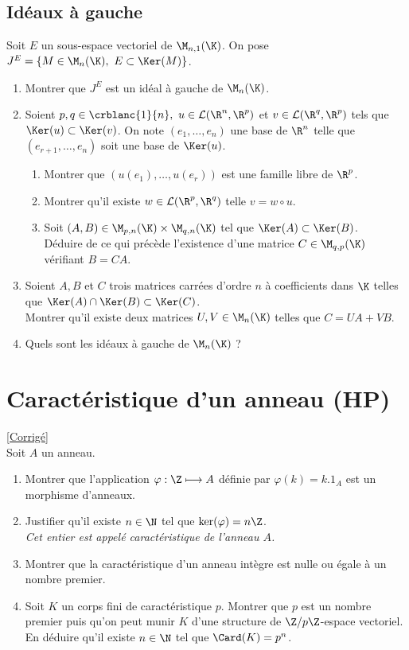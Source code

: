 \documentclass[8pt]{book}
\begin{document}
	\subsection{Idéaux à gauche }
	Soit $E$ un sous-espace vectoriel de $\M_{n,1}(\K)$. On pose $J^E=\{M\in \M_n(\K),\ E\subset \Ker(M)\}$.
	\begin{enumerate}
		\item Montrer que $J^E$ est un idéal à gauche de $\M_n(\K)$.
		\item Soient $p,q\in \crblanc{1}{n},\ u\in \mathcal L(\R^n,\R^p)$ et $v\in \mathcal L(\R^q,\R^p)$ tels que $\Ker(u)\subset \Ker(v)$. On note $(e_1,\dots,e_n)$ une base de $\R^n$ telle que $(e_{r+1},\dots,e_n)$ soit une base de $\Ker(u)$.
		\begin{enumerate}[label=\alph*.]
			\item Montrer que $(u(e_1),\dots,u(e_r))$ est une famille libre de $\R^p$.
			\item Montrer qu'il existe $w\in \mathcal L(\R^p,\R^q)$ telle $v=w\circ u$.
			\item Soit $(A,B)\in \M_{p,n}(\K)\times \M_{q,n}(\K)$ tel que $\Ker(A)\subset \Ker(B)$.\\
			Déduire de ce qui précède l'existence d'une matrice $C\in \M_{q,p}(\K)$ vérifiant $B=CA$.
		\end{enumerate}
		\item Soient $A,B$ et $C$ trois matrices carrées d'ordre $n$ à coefficients dans $\K$ telles que $\Ker(A)\cap\Ker(B)\subset \Ker(C)$.\\
		Montrer qu'il existe deux matrices $U,V\in \M_n(\K)$ telles que $C=UA+VB$.
		\item Quels sont les idéaux à gauche de $\M_n(\K)$ ?
	\end{enumerate}
	
	\section{Caractéristique d'un anneau  (HP)}
	\label{Caractéristique d'un anneau}
	\textcolor{blue}{\hyperref[Caractéristique d'un anneau corrigé]{[Corrigé]}}\\
	Soit $A$ un anneau.
	\begin{enumerate}[leftmargin=*]
		\item Montrer que l'application $\varphi :\Z \longmapsto A$ définie par $\varphi(k)=k.1_A$ est un morphisme d'anneaux.
		\item Justifier qu'il existe $n\in \N$ tel que $\ker(\varphi)=n\Z$.\\
		\textit{Cet entier est appelé caractéristique de l'anneau $A$.}
		\item Montrer que la caractéristique d'un anneau intègre est nulle ou égale à un nombre premier.
		\item Soit $K$ un corps fini de caractéristique $p$. Montrer que $p$ est un nombre premier puis qu'on peut munir $K$ d'une structure de $\Z/p\Z$-espace vectoriel. En déduire qu'il existe $n\in \N$ tel que $\Card(K)=p^n$.
	\end{enumerate}
	
\end{document}
